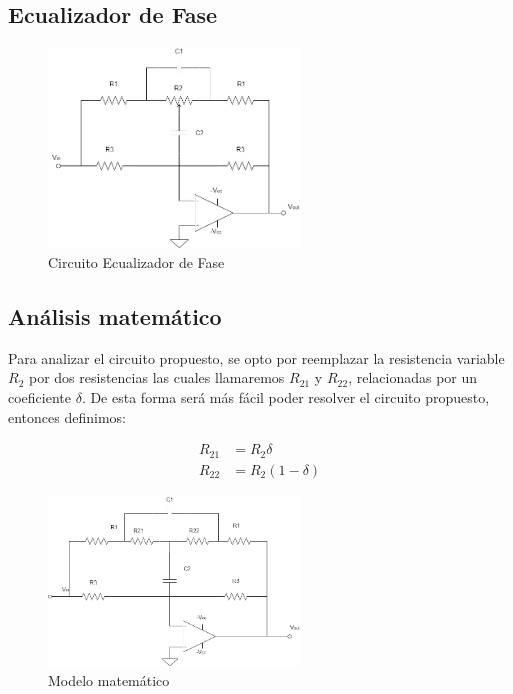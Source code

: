 
\subsection{Ecualizador de Fase}


\begin{figure}[H]
	\centering
	\includegraphics[width=0.6\textwidth]{../Ejercicio4-EcualizadorDeFase/Informe/Ecualizador de Fase.png}
	\caption{Circuito Ecualizador de Fase}
\end{figure}


\subsection{Análisis matemático}

Para analizar el circuito propuesto, se opto por reemplazar la resistencia variable $R_2$ por dos resistencias las cuales llamaremos 
$R_{21}$ y $R_{22}$, relacionadas por un coeficiente $\delta$. 
De esta forma será más fácil poder resolver el circuito propuesto, entonces definimos:

\begin{align}
		R_{21} &= R_2  \delta \\
		R_{22} &= R_2  (1 - \delta)
\end{align}


\begin{figure}[H]
	\centering
	\includegraphics[width=0.6\textwidth]{../Ejercicio4-EcualizadorDeFase/Informe/EcSinPot.png}
	\caption{Modelo matemático}
\end{figure}

